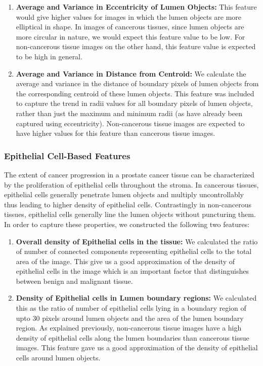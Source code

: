 \begin{enumerate}
\item \textbf{Average and Variance in Eccentricity of Lumen Objects:} This feature would give higher values for images in which the lumen objects are more elliptical in shape. In images of cancerous tissues, since lumen objects are more circular in nature, we would expect this feature value to be low. For non-cancerous tissue images on the other hand, this feature value is expected to be high in general.

\item \textbf{Average and Variance in Distance from Centroid:} We calculate the average and variance in the distance of boundary pixels of lumen objects from the corresponding centroid of these lumen objects. This feature was included to capture the trend in radii values for all boundary pixels of lumen objects, rather than just the maximum and minimum radii (as have already been captured using eccentricity). Non-cancerous tissue images are expected to have higher values for this feature than cancerous tissue images.

\end{enumerate}

\subsubsection{Epithelial Cell-Based Features}
The extent of cancer progression in a prostate cancer tissue can be characterized by the proliferation of epithelial cells throughout the stroma. In cancerous tissues, epithelial cells generally penetrate lumen objects and multiply uncontrollably thus leading to higher density of epithelial cells. Contrastingly in non-cancerous tissues, epithelial cells generally line the lumen objects without puncturing them. In order to capture these properties, we constructed the following two features:

\begin{enumerate}
\item \textbf{Overall density of Epithelial cells in the tissue:} We calculated the ratio of number of connected components representing epithelial cells to the total area of the image. This give us a good approximation of the density of epithelial cells in the image which is an important factor that distinguishes between benign and malignant tissue.

\item \textbf{Density of Epithelial cells in Lumen boundary regions:} We calculated this as the ratio of number of epithelial cells lying in a boundary region of upto 30 pixels around lumen objects and the area of the lumen boundary region. As explained previously, non-cancerous tissue images have a high density of epithelial cells along the lumen boundaries than cancerous tissue images. This feature gave us a good approximation of the density of epithelial cells around lumen objects.

\end{enumerate}

